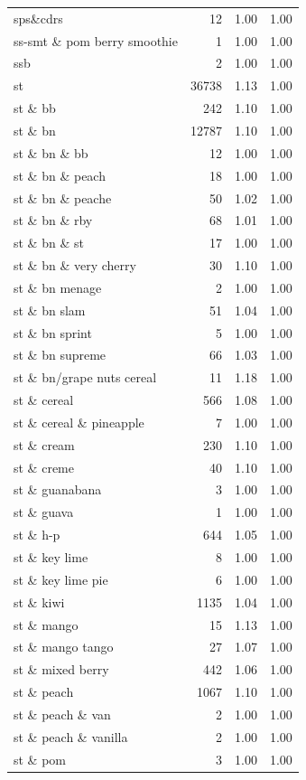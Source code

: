 \begin{table}
\begin{tabular}{lrrr}
sps\&cdrs & 12 & 1.00 & 1.00 \\
ss-smt \& pom berry smoothie & 1 & 1.00 & 1.00 \\
ssb & 2 & 1.00 & 1.00 \\
st & 36738 & 1.13 & 1.00 \\
st \& bb & 242 & 1.10 & 1.00 \\
st \& bn & 12787 & 1.10 & 1.00 \\
st \& bn \& bb & 12 & 1.00 & 1.00 \\
st \& bn \& peach & 18 & 1.00 & 1.00 \\
st \& bn \& peache & 50 & 1.02 & 1.00 \\
st \& bn \& rby & 68 & 1.01 & 1.00 \\
st \& bn \& st & 17 & 1.00 & 1.00 \\
st \& bn \& very cherry & 30 & 1.10 & 1.00 \\
st \& bn menage & 2 & 1.00 & 1.00 \\
st \& bn slam & 51 & 1.04 & 1.00 \\
st \& bn sprint & 5 & 1.00 & 1.00 \\
st \& bn supreme & 66 & 1.03 & 1.00 \\
st \& bn/grape nuts cereal & 11 & 1.18 & 1.00 \\
st \& cereal & 566 & 1.08 & 1.00 \\
st \& cereal \& pineapple & 7 & 1.00 & 1.00 \\
st \& cream & 230 & 1.10 & 1.00 \\
st \& creme & 40 & 1.10 & 1.00 \\
st \& guanabana & 3 & 1.00 & 1.00 \\
st \& guava & 1 & 1.00 & 1.00 \\
st \& h-p & 644 & 1.05 & 1.00 \\
st \& key lime & 8 & 1.00 & 1.00 \\
st \& key lime pie & 6 & 1.00 & 1.00 \\
st \& kiwi & 1135 & 1.04 & 1.00 \\
st \& mango & 15 & 1.13 & 1.00 \\
st \& mango tango & 27 & 1.07 & 1.00 \\
st \& mixed berry & 442 & 1.06 & 1.00 \\
st \& peach & 1067 & 1.10 & 1.00 \\
st \& peach \& van & 2 & 1.00 & 1.00 \\
st \& peach \& vanilla & 2 & 1.00 & 1.00 \\
st \& pom & 3 & 1.00 & 1.00 \\

\end{tabular}
\end{table}
